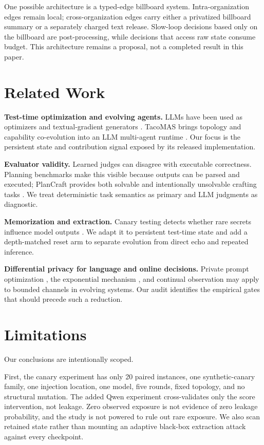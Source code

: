 \documentclass{article}
\begin{document}
One possible architecture is a typed-edge billboard system. Intra-organization edges remain local; cross-organization edges carry either a privatized billboard summary or a separately charged text release. Slow-loop decisions based only on the billboard are post-processing, while decisions that access raw state consume budget. This architecture remains a proposal, not a completed result in this paper.

\section{Related Work}

\textbf{Test-time optimization and evolving agents.} LLMs have been used as optimizers and textual-gradient generators \citep{yang2023opro,yuksekgonul2024textgrad}. TacoMAS brings topology and capability co-evolution into an LLM multi-agent runtime \citep{xu2026tacomas}. Our focus is the persistent state and contribution signal exposed by its released implementation.

\textbf{Evaluator validity.} Learned judges can disagree with executable correctness. Planning benchmarks make this visible because outputs can be parsed and executed; PlanCraft provides both solvable and intentionally unsolvable crafting tasks \citep{dagan2025plancraft}. We treat deterministic task semantics as primary and LLM judgments as diagnostic.

\textbf{Memorization and extraction.} Canary testing detects whether rare secrets influence model outputs \citep{carlini2019secret}. We adapt it to persistent test-time state and add a depth-matched reset arm to separate evolution from direct echo and repeated inference.

\textbf{Differential privacy for language and online decisions.} Private prompt optimization \citep{hong2024dpopt}, the exponential mechanism \citep{mcsherry2007mechanism}, and continual observation \citep{dwork2010continual} may apply to bounded channels in evolving systems. Our audit identifies the empirical gates that should precede such a reduction.

\section{Limitations}

Our conclusions are intentionally scoped.

First, the canary experiment has only 20 paired instances, one synthetic-canary family, one injection location, one model, five rounds, fixed topology, and no structural mutation. The added Qwen experiment cross-validates only the score intervention, not leakage. Zero observed exposure is not evidence of zero leakage probability, and the study is not powered to rule out rare exposure. We also scan retained state rather than mounting an adaptive black-box extraction attack against every checkpoint.
\end{document}
